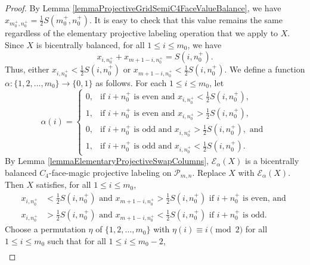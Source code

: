 \documentclass[12pt]{amsart}
\theoremstyle{definition}
\theoremstyle{plain}
\begin{document}
\begin{proof}
  By Lemma \ref{lemmaProjectiveGridSemiC4FaceValueBalance}, we have $x_{m_0^{+},n_0^{+}}=\tfrac{1}{2} S(m^{+}_0,n^{+}_0)$.
  It is easy to check that this value remains the same regardless of the elementary projective labeling operation that we apply to $X$.
  Since $X$ is bicentrally balanced, for all $1 \leqslant i \leqslant m_0$, we have
  \begin{equation*}
    x_{i,n_0^{+}} + x_{m+1-i,n_0^{+}} =S(i,n^{+}_0).
  \end{equation*}
  Thus, either  $x_{i,n_0^{+}} < \tfrac{1}{2}S(i,n^{+}_0)$ or $x_{m+1-i,n_0^{+}} < \tfrac{1}{2}S(i,n^{+}_0)$.
  We define a function $\alpha:\{1,2,\allowbreak \ldots,\allowbreak m_0\}\allowbreak \rightarrow \allowbreak \{0,1\}$ as follows.
  For each $1 \leqslant i \leqslant m_0$, let
  \begin{equation*}
    \alpha(i) = \left\{\begin{array}{ll}
              0, &\mbox{if \ } i+n^{+}_0 \mbox{ is even and } x_{i,n_0^{+}} < \tfrac{1}{2}S(i,n^{+}_0), \\
              1, &\mbox{if \ } i+n^{+}_0 \mbox{ is even and } x_{i,n_0^{+}} > \tfrac{1}{2}S(i,n^{+}_0), \\
              0, &\mbox{if \ } i+n^{+}_0 \mbox{ is odd and } x_{i,n_0^{+}} > \tfrac{1}{2}S(i,n^{+}_0), \mbox{ and } \\
              1, &\mbox{if \ } i+n^{+}_0 \mbox{ is odd and } x_{i,n_0^{+}} < \tfrac{1}{2}S(i,n^{+}_0).
\end{array} \right.
  \end{equation*}
  By Lemma \ref{lemmaElementaryProjectiveSwapColumns},  $\mathcal{E}_{\alpha}(X)$ is a bicentrally balanced $C_4$-face-magic projective labeling on $\mathcal{P}_{m,n}$.
  Replace $X$ with $\mathcal{E}_{\alpha}(X)$. Then $X$ satisfies,
  for all $1 \leqslant i \leqslant m_0$,
  \begin{align*}
    x_{i,n_0^{+}} &<\tfrac{1}{2}S(i,n^{+}_0) \mbox{ and } x_{m+1-i,n_0^{+}} > \tfrac{1}{2}S(i,n^{+}_0) \mbox{ if } i+n^{+}_0 \mbox{ is even, and } \\
     x_{i,n_0^{+}} &>\tfrac{1}{2}S(i,n^{+}_0) \mbox{ and } x_{m+1-i,n_0^{+}} < \tfrac{1}{2}S(i,n^{+}_0) \mbox{ if } i+n^{+}_0 \mbox{ is odd.}
  \end{align*}
  Choose a permutation $\eta$ of $\{1,2,\ldots,m_0\}$ with $\eta(i)\equiv i \pmod{2}$ for all $1 \leqslant i \leqslant m_0$
  such that for all  $1 \leqslant i \leqslant m_0 -2$,
  \begin{align*}

\end{align*}
\end{proof}
\end{document}
